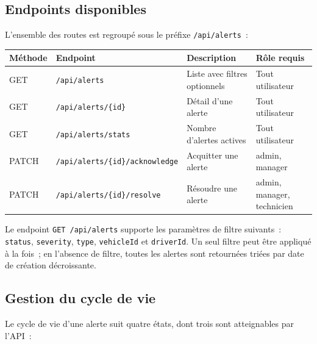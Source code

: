 \documentclass[12pt,a4paper]{article}
\begin{document}
\vspace{0.5cm}

\subsection{Endpoints disponibles}

L'ensemble des routes est regroupé sous le préfixe \texttt{/api/alerts}~:

\begin{center}
\begin{tabular}{|l|l|l|l|}
  \hline
  \rowcolor{primary!10}
  \textbf{Méthode} & \textbf{Endpoint} & \textbf{Description} & \textbf{Rôle requis} \\
  \hline
  GET   & \texttt{/api/alerts}                  & Liste avec filtres optionnels  & Tout utilisateur \\
  GET   & \texttt{/api/alerts/\{id\}}           & Détail d'une alerte            & Tout utilisateur \\
  GET   & \texttt{/api/alerts/stats}            & Nombre d'alertes actives       & Tout utilisateur \\
  PATCH & \texttt{/api/alerts/\{id\}/acknowledge} & Acquitter une alerte         & admin, manager \\
  PATCH & \texttt{/api/alerts/\{id\}/resolve}   & Résoudre une alerte            & admin, manager, technicien \\
  \hline
\end{tabular}
\end{center}

\vspace{0.3cm}

Le endpoint \texttt{GET /api/alerts} supporte les paramètres de filtre suivants~:
\texttt{status}, \texttt{severity}, \texttt{type}, \texttt{vehicleId} et
\texttt{driverId}. Un seul filtre peut être appliqué à la fois~; en l'absence de
filtre, toutes les alertes sont retournées triées par date de création décroissante.

\subsection{Gestion du cycle de vie}

Le cycle de vie d'une alerte suit quatre états, dont trois sont atteignables par
l'API~:
\end{document}
